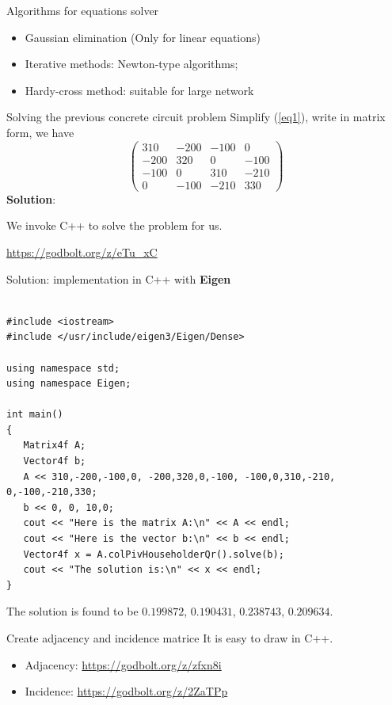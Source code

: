 \documentclass[xcolor=dvipsnames]{beamer}
\begin{document}
\begin{frame}{Algorithms for equations solver}
\begin{itemize}
	\item Gaussian elimination (Only for linear equations)
	\item Iterative methods: {\color{red}Newton-type} algorithms;
	\item Hardy-cross method: suitable for large network
\end{itemize}
	
\end{frame}

\begin{frame}{Solving the previous concrete circuit problem}
	Simplify (\ref{eq1}), write in matrix form, we have
	\[
\left(
	\begin{array}{ccc|c}
	  310 & -200 & -100 & 0\\
	  -200 & 320 & 0 & -100\\
	  -100 & 0 & 310 & -210\\
	  0 & -100 & -210 & 330
	\end{array}	
\right)
\]
\textbf{Solution}: 

We invoke C++ to solve the problem for us.

\url{https://godbolt.org/z/eTu_xC}

\end{frame}

\begin{frame}[fragile,shrink=30]{Solution: implementation in C++ with \textbf{Eigen}}
\begin{verbatim}

#include <iostream>
#include </usr/include/eigen3/Eigen/Dense>
 
using namespace std;
using namespace Eigen;
 
int main()
{
   Matrix4f A;
   Vector4f b;
   A << 310,-200,-100,0, -200,320,0,-100, -100,0,310,-210, 0,-100,-210,330;
   b << 0, 0, 10,0;
   cout << "Here is the matrix A:\n" << A << endl;
   cout << "Here is the vector b:\n" << b << endl;
   Vector4f x = A.colPivHouseholderQr().solve(b);
   cout << "The solution is:\n" << x << endl;
}
\end{verbatim}
	The solution is found to be $0.199872$, $0.190431$, $0.238743$, $0.209634$.
\end{frame}

\begin{frame}{Create adjacency and incidence matrice}
It is easy to draw in C++.
	\begin{itemize}
		\item Adjacency: \url{https://godbolt.org/z/zfxn8i}
		\item Incidence: \url{https://godbolt.org/z/2ZaTPp}

	\end{itemize}
\end{frame}
\end{document}
